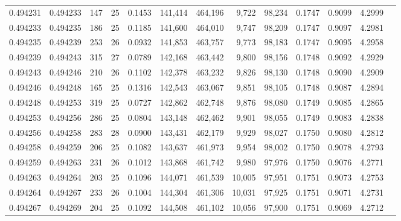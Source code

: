 \begin{tabular}{rrrrrrrrrrrrr}
0.494231 & 0.494233 & 147 &  25 &                                     0.1453 & 141,414 & 464,196 &   9,722 &  98,234 & 0.1747 & 0.9099 & 4.2999 \\
0.494233 & 0.494235 & 186 &  25 &                                     0.1185 & 141,600 & 464,010 &   9,747 &  98,209 & 0.1747 & 0.9097 & 4.2981 \\
0.494235 & 0.494239 & 253 &  26 &                                     0.0932 & 141,853 & 463,757 &   9,773 &  98,183 & 0.1747 & 0.9095 & 4.2958 \\
0.494239 & 0.494243 & 315 &  27 &                                     0.0789 & 142,168 & 463,442 &   9,800 &  98,156 & 0.1748 & 0.9092 & 4.2929 \\
0.494243 & 0.494246 & 210 &  26 &                                     0.1102 & 142,378 & 463,232 &   9,826 &  98,130 & 0.1748 & 0.9090 & 4.2909 \\
0.494246 & 0.494248 & 165 &  25 &                                     0.1316 & 142,543 & 463,067 &   9,851 &  98,105 & 0.1748 & 0.9087 & 4.2894 \\
0.494248 & 0.494253 & 319 &  25 &                                     0.0727 & 142,862 & 462,748 &   9,876 &  98,080 & 0.1749 & 0.9085 & 4.2865 \\
0.494253 & 0.494256 & 286 &  25 &                                     0.0804 & 143,148 & 462,462 &   9,901 &  98,055 & 0.1749 & 0.9083 & 4.2838 \\
0.494256 & 0.494258 & 283 &  28 &                                     0.0900 & 143,431 & 462,179 &   9,929 &  98,027 & 0.1750 & 0.9080 & 4.2812 \\
0.494258 & 0.494259 & 206 &  25 &                                     0.1082 & 143,637 & 461,973 &   9,954 &  98,002 & 0.1750 & 0.9078 & 4.2793 \\
0.494259 & 0.494263 & 231 &  26 &                                     0.1012 & 143,868 & 461,742 &   9,980 &  97,976 & 0.1750 & 0.9076 & 4.2771 \\
0.494263 & 0.494264 & 203 &  25 &                                     0.1096 & 144,071 & 461,539 &  10,005 &  97,951 & 0.1751 & 0.9073 & 4.2753 \\
0.494264 & 0.494267 & 233 &  26 &                                     0.1004 & 144,304 & 461,306 &  10,031 &  97,925 & 0.1751 & 0.9071 & 4.2731 \\
0.494267 & 0.494269 & 204 &  25 &                                     0.1092 & 144,508 & 461,102 &  10,056 &  97,900 & 0.1751 & 0.9069 & 4.2712 \\

\end{tabular}
